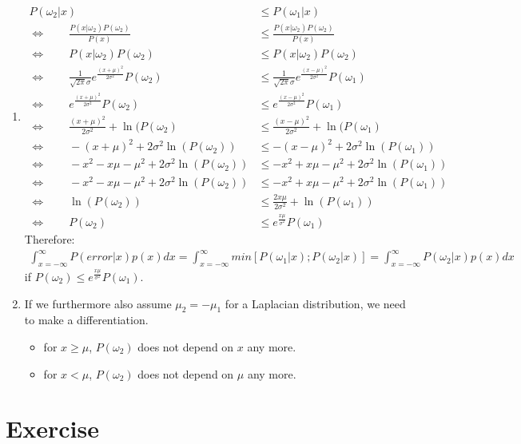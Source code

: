 \documentclass[a4paper]{article}
\begin{document}
		\begin{enumerate}[label={(\alph*)}]
		\item
			\begin{align*}
			P(\omega_2|x) &\leq P(\omega_1|x)\\
			\Leftrightarrow \qquad \frac{P(x|\omega_2)P(\omega_2)}{P(x)} &\leq \frac{P(x|\omega_2)P(\omega_2)}{P(x)}\\
			\Leftrightarrow \qquad P(x|\omega_2)P(\omega_2)&\leq P(x|\omega_2)P(\omega_2)\\
			\Leftrightarrow \qquad \frac{1}{\sqrt{2\pi}\sigma}e^{ \displaystyle\frac{(x+\mu)^2}{2\sigma^2}}P(\omega_2) &\leq \frac{1}{\sqrt{2\pi}\sigma}e^{\displaystyle \frac{(x-\mu)^2}{2\sigma^2}}P(\omega_1)\\
			\Leftrightarrow \qquad e^{\displaystyle\frac{(x+\mu)^2}{2\sigma^2}}P(\omega_2) &\leq e^{\displaystyle \frac{(x-\mu)^2}{2\sigma^2}}P(\omega_1)\\
			\Leftrightarrow \qquad \frac{(x+\mu)^2}{2\sigma^2} + \ln(P(\omega_2) &\leq \frac{(x-\mu)^2}{2\sigma^2} + \ln(P(\omega_1)\\
			\Leftrightarrow \qquad -(x+\mu)^2 + 2\sigma^2\ln(P(\omega_2)) &\leq -(x-\mu)^2 + 2\sigma^2\ln(P(\omega_1))\\
			\Leftrightarrow \qquad -x^2 -x\mu -\mu^2 + 2\sigma^2\ln(P(\omega_2)) &\leq -x^2+x\mu -\mu^2 + 2\sigma^2\ln(P(\omega_1))\\
			\Leftrightarrow \qquad -x^2 -x\mu -\mu^2 + 2\sigma^2\ln(P(\omega_2)) &\leq -x^2+x\mu -\mu^2 + 2\sigma^2\ln(P(\omega_1))\\
			\Leftrightarrow \qquad \ln(P(\omega_2)) &\leq \frac{2x\mu}{2\sigma^2}+\ln(P(\omega_1))\\
			\Leftrightarrow \qquad P(\omega_2) &\leq e^{\displaystyle \frac{x\mu}{\sigma^2}}P(\omega_1)
			\end{align*}
			Therefore:\\
			\begin{align*}
				\int_{x=-\infty}^\infty P(error|x)p(x)dx=\int_{x=-\infty}^\infty min[P(\omega_1|x); P(\omega_2|x)]=\int_{x=-\infty}^\infty P(\omega_2|x)p(x)dx
			\end{align*}
			if $P(\omega_2) \leq e^{\frac{x\mu}{\sigma^2}}P(\omega_1)$.
			\item If we furthermore also assume $\mu_2 = -\mu_1$ for a Laplacian distribution, we need to make a differentiation.
			\begin{itemize}
				\item for $x\geq \mu$, $P(\omega_2)$ does not depend on $x$ any more.
				\item for $x < \mu$, $P(\omega_2)$ does not depend on $\mu$ any more.
			\end{itemize}
		\end{enumerate}
	\section{Exercise}
\end{document}
